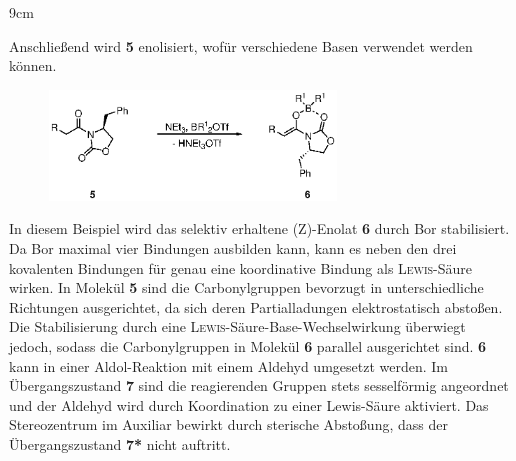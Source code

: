 \documentclass[../kl11.tex]{subfiles}
\begin{document}
\begin{framed}
\vspace{4cm}
\end{framed}
{9cm}

Anschließend wird \textbf{5} enolisiert, wofür verschiedene Basen verwendet werden können. 

\begin{figure}[H]
    \centering
    \includegraphics[width=0.68\textwidth]{2024/Abbildungen/Auxiliarchemie/3.eps}
\end{figure}

In diesem Beispiel wird das selektiv erhaltene (Z)-Enolat \textbf{6} durch Bor stabilisiert. Da Bor maximal vier Bindungen ausbilden kann, kann es neben den drei kovalenten Bindungen für genau eine koordinative Bindung als \textsc{Lewis}-Säure wirken. In Molekül \textbf{5} sind die Carbonylgruppen bevorzugt in unterschiedliche Richtungen ausgerichtet, da sich deren Partialladungen elektrostatisch abstoßen. Die Stabilisierung durch eine \textsc{Lewis}-Säure-Base-Wechselwirkung überwiegt jedoch, sodass die Carbonylgruppen in Molekül \textbf{6} parallel ausgerichtet sind. 
\textbf{6} kann in einer Aldol-Reaktion mit einem Aldehyd umgesetzt werden. Im Übergangszustand \textbf{7} sind die reagierenden Gruppen stets sesselförmig angeordnet und der Aldehyd wird durch Koordination zu einer Lewis-Säure aktiviert. Das Stereozentrum im Auxiliar bewirkt durch sterische Abstoßung, dass der Übergangszustand \textbf{7*} nicht auftritt. 
\end{document}
